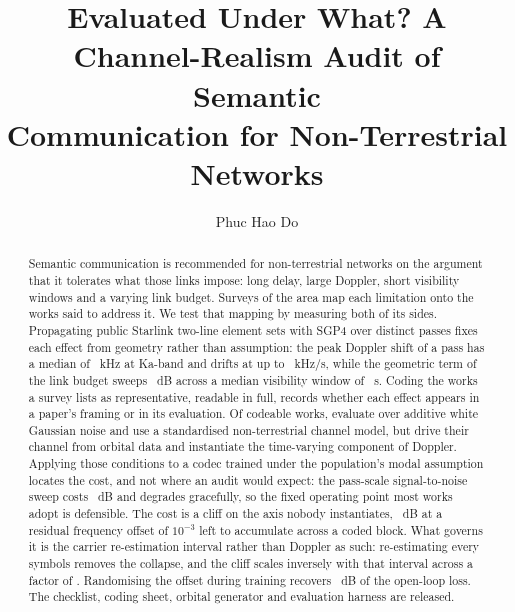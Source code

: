 \documentclass[preprint,11pt,3p]{elsarticle}
\begin{document}
\begin{frontmatter}

\title{Evaluated Under What? A Channel-Realism Audit of Semantic\\
Communication for Non-Terrestrial Networks}

%
\author[a]{Phuc Hao Do}
\address[a]{CAIRA-DAU, Center for Advanced Innovation, Research \& Application,
  Danang Architecture University, Da Nang, Viet Nam}

\begin{abstract}
Semantic communication is recommended for non-terrestrial networks on the argument that it
tolerates what those links impose: long delay, large Doppler, short visibility windows and a
varying link budget. Surveys of the area map each limitation onto the works said to address it. We test that mapping by measuring both of its
sides. Propagating \numSats{} public Starlink two-line element sets with SGP4 over
\numPasses{} distinct passes fixes each effect from geometry rather than assumption: the peak
Doppler shift of a pass has a median of \numDopKaMed~kHz at Ka-band and drifts at up to
\numDopRateMax~kHz/s, while the geometric term of the link budget sweeps \numFsplMed~dB across a
median visibility window of \numDurMed~s. Coding the \numPop{} works a survey lists as representative,
\numFull{} readable in full, records whether each effect appears in a paper's framing or in its
evaluation. Of \numCoded{} codeable works,
\numEvCHAWGN{} evaluate over additive white Gaussian noise and \numEvCHGPP{} use a standardised
non-terrestrial channel model, but \numEvCHTRACE{} drive their channel from orbital data and
\numEvDOPPLERRATE{} instantiate the time-varying component of Doppler.
Applying those conditions to a codec trained under the population's modal assumption locates the
cost, and not where an audit would expect: the pass-scale signal-to-noise sweep costs
\numPsnrDrop~dB and degrades gracefully, so the fixed operating point most works adopt is
defensible. The cost is a cliff on the axis nobody instantiates, \numDropCfoEb~dB at a residual
frequency offset of $10^{-3}$ left to accumulate across a coded block. What governs it is the
carrier re-estimation interval rather than Doppler as such: re-estimating every \numLprac{}
symbols removes the collapse, and the cliff scales inversely with that interval across a factor
of \numLspan{}. Randomising the offset during training recovers \numAugGainCfo~dB of the
open-loop loss. The checklist, coding sheet, orbital generator and evaluation harness are
released.
\end{abstract}


\end{frontmatter}
\end{document}

